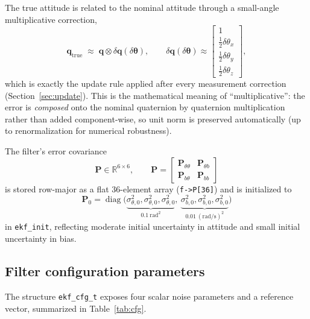 \documentclass[11pt]{article}
\newcommand{\vect}[1]{\bm{#1}}
\newcommand{\mat}[1]{\bm{#1}}
\newcommand{\R}{\mathbb{R}}
\newcommand{\quat}{\vect{q}}
\begin{document}
The true attitude is related to the nominal attitude through a small-angle multiplicative correction,
\begin{equation}
\quat_{\text{true}} \;\approx\; \quat \otimes \delta\quat(\delta\vect\theta), \qquad
\delta\quat(\delta\vect\theta) \approx \begin{bmatrix}1\\ \tfrac12\delta\theta_x\\ \tfrac12\delta\theta_y\\ \tfrac12\delta\theta_z\end{bmatrix},
\label{eq:mekf-correction}
\end{equation}
which is exactly the update rule applied after every measurement correction (Section~\ref{sec:update}). This is the mathematical meaning of ``multiplicative'': the error is \emph{composed} onto the nominal quaternion by quaternion multiplication rather than added component-wise, so unit norm is preserved automatically (up to renormalization for numerical robustness).

The filter's error covariance
\begin{equation}
\mat P \in \R^{6\times 6}, \qquad \mat P = \begin{bmatrix}
\mat P_{\theta\theta} & \mat P_{\theta b} \\
\mat P_{b\theta} & \mat P_{bb}
\end{bmatrix}
\end{equation}
is stored row-major as a flat 36-element array (\texttt{f->P[36]}) and is initialized to
\begin{equation}
\mat P_0 = \operatorname{diag}\big(\underbrace{\sigma_{\theta,0}^2,\sigma_{\theta,0}^2,\sigma_{\theta,0}^2}_{0.1\ \mathrm{rad}^2},\ \underbrace{\sigma_{b,0}^2,\sigma_{b,0}^2,\sigma_{b,0}^2}_{0.01\ (\mathrm{rad/s})^2}\big)
\end{equation}
in \texttt{ekf\_init}, reflecting moderate initial uncertainty in attitude and small initial uncertainty in bias.

\subsection{Filter configuration parameters}

The structure \texttt{ekf\_cfg\_t} exposes four scalar noise parameters and a reference vector, summarized in Table~\ref{tab:cfg}.
\end{document}
